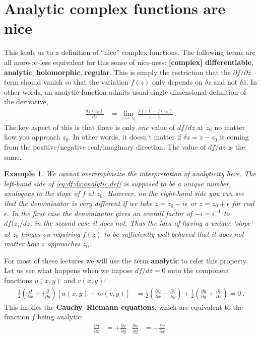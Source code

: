 \documentclass[
  11pt,
	colorful,
	raggedright,
]{tufte-style-thesis-flip}
\newtheorem{example}{Example}[section]
\begin{document}
\section{Analytic complex functions are nice}

This leads us to a definition of ``nice'' complex functions. The following terms are all more-or-less equivalent for this sense of nice-ness: \textbf{[complex] differentiable}, \textbf{analytic}, \textbf{holomorphic}, \textbf{regular}. This is simply the restriction that the $\partial f/\partial \bar z$ term should vanish so that the variation $f(z)$ only depends on $\delta z$ and not $\delta\bar z$. In other words, an analytic function admits usual single-dimensional definition of the derivative,
\begin{align}
  \frac{df(z_0)}{dz} &= \lim_{z\to z_0} \frac{f(z)-f(z_0)}{z-z_0} \ .
  \label{eq:df:dz:analytic:def}
\end{align}
The key aspect of this is that there is only \emph{one} value of $df/dz$ at $z_0$ no matter how you approach $z_0$. In other words, it doesn't matter if $\delta z = z-z_0$ is coming from the positive/negative real/imaginary direction. The value of $df/dz$ is the same. 

\begin{example}
We cannot overemphasize the interpretation of analyticity here. The left-hand side of \eqref{eq:df:dz:analytic:def} is supposed to be a \emph{unique number}, analogous to the slope of $f$ at $z_0$. However, on the right-hand side you can see that the denominator is very different if we take $z = z_0+ i \epsilon$ or $z= z_0 + \epsilon$ for real $\epsilon$. In the first case the denominator gives an overall factor of $-i = i^{-1}$ to $df(z_)/dz$, in the second case it does not. Thus the idea of having a unique `slope' at $z_0$ hinges on requiring $f(z)$ to be sufficiently well-behaved that it does not matter how $z$ approaches $z_0$.
\end{example}

For most of these lectures we will use the term \textbf{analytic} to refer this property. Let us see what happens when we impose $df/d\bar{z} = 0$ onto the component functions $u(x,y)$ and $v(x,y)$:
\begin{align}
  \frac{1}{2}\left(\frac{\partial}{\partial x} + i \frac{\partial}{\partial y}\right)
  \left[u(x,y)+iv(v,y)\right]
  &= 
  \frac{1}{2}
  \left( \frac{\partial u}{\partial x} - \frac{\partial v}{\partial y} \right)
  +
  \frac{i}{2}
  \left( \frac{\partial u}{\partial y} + \frac{\partial v}{\partial x} \right)
  = 0 \ .
\end{align}
This implies the \textbf{Cauchy--Riemann equations}, which are equivalent to the function $f$ being analytic:
\begin{align}
  \frac{\partial u}{\partial x} & = +\frac{\partial v}{\partial y}
  &
  \frac{\partial u}{\partial y} & = -\frac{\partial v}{\partial x} \ .
\end{align}
\end{document}
